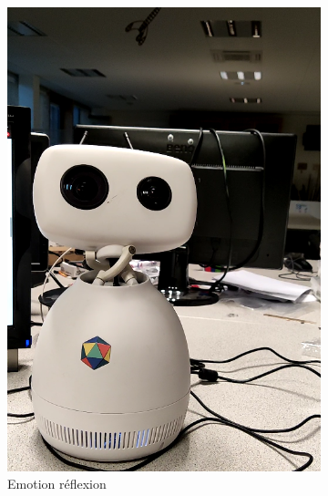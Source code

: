 \documentclass[a4paper,french]{article}
\begin{document}
\begin{figure}[!ht]
\begin{subfigure}{0.25\textwidth}
        \includegraphics[width=\textwidth]{figures/reflexion.png}
        \caption{Emotion réflexion}
        \label{reflexion}
    \end{subfigure}
    \begin{subfigure}{0.25\textwidth}

\end{subfigure}
\end{figure}
\end{document}
